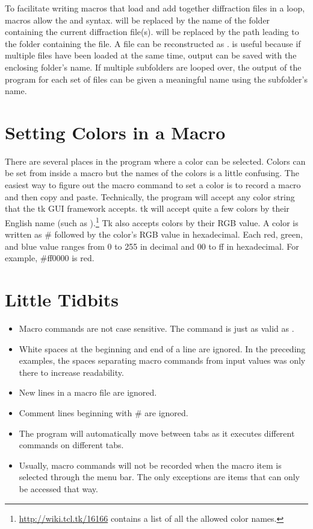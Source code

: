 To facilitate writing macros that load and 
add together diffraction files in a loop, 
macros allow the 
and  syntax.
 will be replaced
by the name of the folder containing the current
diffraction file(s).  
will be replaced by the path leading to the folder 
containing the file. A 
file can be reconstructed as 
.
 is useful because if multiple
files have been loaded at the same time, output can be saved
with the enclosing folder's name. If multiple subfolders
are looped over, the output of the program for each set of 
files can be given a meaningful name using the subfolder's
name.

\section{Setting Colors in a Macro}

There are several places in the program where a
color can be selected. Colors can be set from
inside a macro but the names of the colors is
a little confusing. The easiest way to figure out 
the macro command to set a color is to record a macro
and then copy and paste.
Technically, the program will accept 
any color string that the tk GUI framework accepts. tk
will accept quite a few colors by their English name (such as 
).\footnote{\url{http://wiki.tcl.tk/16166} 
contains a list of all the allowed color names.} 
Tk also accepts colors
by their RGB value. A color is written as \#
followed by the color's RGB value in hexadecimal.
Each red, green, and blue value ranges from 0 to 255 in
decimal and 00 to ff in hexadecimal. For example, \#ff0000 is red. 

\section{Little Tidbits}\label{Little Tidbits}
\begin{itemize}
    \item Macro commands are not case
    sensitive. The command  
    is just as valid as 
    . 
    \item White spaces at the beginning and end of a
    line are ignored. In the preceding examples, the
    spaces separating macro commands from input values
    was only there to increase readability. 
    \item New lines in a macro file are ignored.
    \item Comment lines beginning with \# 
    are ignored.
    \item The program will automatically move
    between tabs as it executes different commands 
    on different tabs. 
    \item Usually, macro commands will not be recorded
    when the macro item is selected through the menu bar. The
    only exceptions are items that can only be accessed
    that way.
\end{itemize}


